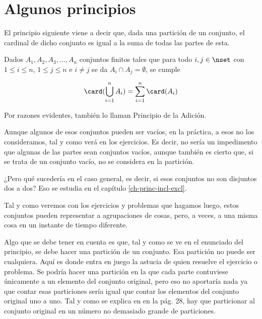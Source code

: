\section{Algunos principios}

El principio siguiente viene a decir que, dada una partición de un conjunto,
el cardinal de dicho conjunto es igual a la suma de todas las partes de
esta.

\begin{theorem}\label{princ-suma}
  Dados $A_1, A_2, A_3, \ldots, A_n$ conjuntos finitos tales que para todo
  $i, j \in \nset$ con $1 \leq i \leq n$, $1 \leq j \leq n$ e $i \neq j$ se
  da $A_i \cap A_j = \emptyset$, se cumple

  $$ \card(\bigcup_{i=1}^n A_i) = \sum_{i=1}^n \card(A_i) $$
\end{theorem}

\noindent Por razones evidentes, también lo llaman Principio de la Adición.

Aunque algunos de esos conjuntos pueden ser vacíos, en la práctica, a esos
no los consideramos, tal y como verá en los ejercicios. Es decir, no sería
un impedimento que algunas de las partes sean conjuntos vacíos, aunque
también es cierto que, si se trata de un conjunto vacío, no se considera en
la partición.

¿Pero qué sucedería en el caso general, es decir, si esos conjuntos no son
disjuntos dos a dos? Eso se estudia en el capítulo \ref{ch-princ-incl-excl}.

Tal y como veremos con los ejercicios y problemas que hagamos luego, estos
conjuntos pueden representar a agrupaciones de cosas, pero, a veces, a una
misma cosa en un instante de tiempo diferente.

Algo que se debe tener en cuenta es que, tal y como se ve en el enunciado
del principio, se debe hacer una partición de un conjunto. Esa partición no
puede ser cualquiera. Aquí es donde entra en juego la astucia de quien
resuelve el ejercicio o problema. Se podría hacer una partición en la que
cada parte contuviese únicamente a un elemento del conjunto original, pero
eso no aportaría nada ya que contar esas particiones sería igual que contar
los elementos del conjunto original uno a uno. Tal y como se explica en
\cite{brualdi} en la pág. 28, hay que particionar al conjunto original en un
número no demasiado grande de particiones.

